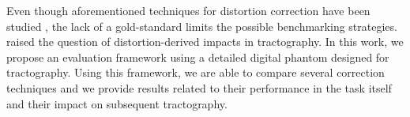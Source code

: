 Even though aforementioned techniques for distortion correction
have been studied \cite{zeng_image_2002,wu_comparison_2008},
the lack of a gold-standard limits the possible benchmarking 
strategies. \cite{irfanoglu_effects_2012} raised the question
of distortion-derived impacts in tractography.
In this work, we propose an evaluation framework
using a detailed digital phantom designed for tractography.
Using this framework,
we are able to compare several correction techniques and we
provide results related to their performance in the task
itself and their impact on subsequent tractography.